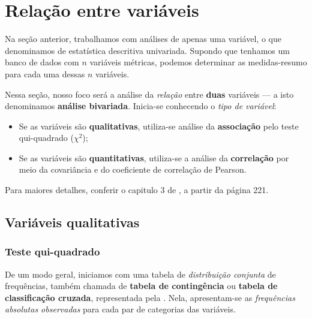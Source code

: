 \section{Relação entre variáveis}%
\label{sec:relacao-entre-variaveis}

Na seção anterior, trabalhamos com análises de apenas uma variável, o que
denominamos de estatística descritiva univariada. Supondo que tenhamos um banco
de dados com $n$ variáveis métricas, podemos determinar as medidas-resumo para
cada uma dessas $n$ variáveis.

Nessa seção, nosso foco será a análise da \emph{relação} entre \textbf{duas}
variáveis --- a isto denominamos \textbf{análise bivariada}. Inicia-se
conhecendo o \emph{tipo de variável}:
\begin{itemize}
    \item Se as variáveis são \textbf{qualitativas}, utiliza-se análise da
    \textbf{associação} pelo teste qui-quadrado ($\chi^2$);
    \item Se as variáveis são \textbf{quantitativas}, utiliza-se a análise da
    \textbf{correlação} por meio da covariância e do coeficiente de correlação
    de Pearson.
\end{itemize}

Para maiores detalhes, conferir o capitulo 3 de \cite{favero}, a partir da
página 221.

\subsection{Variáveis qualitativas}

\subsubsection{Teste qui-quadrado}%

De um modo geral, iniciamos com uma tabela de \emph{distribuição conjunta} de
frequências, também chamada de \textbf{tabela de contingência} ou
\textbf{tabela de classificação cruzada}, representada pela
. Nela, apresentam-se as \emph{frequências
absolutas observadas} para cada par de categorias das variáveis.

